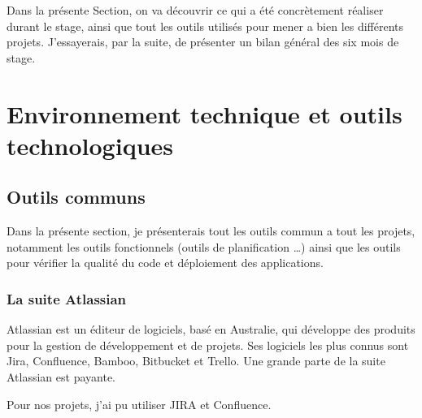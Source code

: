 \par Dans la présente Section, on va découvrir ce qui a été concrètement réaliser durant le stage, ainsi que tout les outils utilisés pour mener a bien les différents projets. J'essayerais, par la suite, de présenter un bilan général des six mois de stage.  

\begingroup
    \let\clearpage\relax
    \chapter{Environnement technique et outils technologiques}
\endgroup
\section{Outils communs}
\par Dans la présente section, je présenterais tout les outils commun a tout les projets, notamment les outils fonctionnels (outils de planification \dots) ainsi que les outils pour vérifier la qualité du code et déploiement des applications. 
\subsection{La suite Atlassian}
\par Atlassian est un éditeur de logiciels, basé en Australie, qui développe des produits pour la gestion de développement et de projets. Ses logiciels les plus connus sont Jira, Confluence, Bamboo, Bitbucket et Trello. Une grande parte de la suite Atlassian est payante.
\par Pour nos projets, j'ai pu utiliser JIRA et Confluence.

